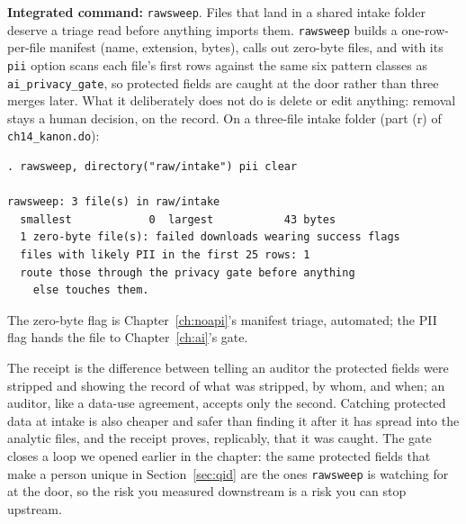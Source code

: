 \documentclass[
    a4paper,
    fontsize=10pt,
    twoside=true,
    numbers=noenddot,
]{kaobook}
\begin{document}
\begin{kaobox}[frametitle=Package Integration: \texttt{rawsweep}]
\textbf{Integrated command:} \texttt{rawsweep}. Files that land in a shared intake folder deserve a triage read before anything imports them. \texttt{rawsweep} builds a one-row-per-file manifest (name, extension, bytes), calls out zero-byte files, and with its \texttt{pii} option scans each file's first rows against the same six pattern classes as \texttt{ai\_privacy\_gate}, so protected fields are caught at the door rather than three merges later. What it deliberately does not do is delete or edit anything: removal stays a human decision, on the record. On a three-file intake folder (part (r) of \texttt{ch14\_kanon.do}):
\par
{\footnotesize
\begin{verbatim}
. rawsweep, directory("raw/intake") pii clear

rawsweep: 3 file(s) in raw/intake
  smallest            0  largest           43 bytes
  1 zero-byte file(s): failed downloads wearing success flags
  files with likely PII in the first 25 rows: 1
  route those through the privacy gate before anything
    else touches them.
\end{verbatim}
}
The zero-byte flag is Chapter~\ref{ch:noapi}'s manifest triage, automated; the PII flag hands the file to Chapter~\ref{ch:ai}'s gate.
\end{kaobox}

The receipt is the difference between telling an auditor the protected fields were stripped and showing the record of what was stripped, by whom, and when; an auditor, like a data-use agreement, accepts only the second. Catching protected data at intake is also cheaper and safer than finding it after it has spread into the analytic files, and the receipt proves, replicably, that it was caught. The gate closes a loop we opened earlier in the chapter: the same protected fields that make a person unique in Section~\ref{sec:qid} are the ones \texttt{rawsweep} is watching for at the door, so the risk you measured downstream is a risk you can stop upstream.
\end{document}
